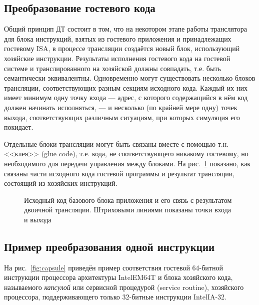 \subsection{Преобразование гостевого кода}

Общий принцип ДТ состоит в том, что на некотором этапе работы транслятора для блока инструкций, взятых из гостевого приложения и принадлежащих гостевому ISA, в процессе трансляции создаётся новый блок, использующий хозяйские инструкции. Результаты исполнения гостевого кода на гостевой системе и транслированного на хозяйской должны совпадать, т.е. быть семантически эквивалентны. Одновременно могут существовать несколько блоков трансляции, соответствующих разным секциям исходного кода. Каждый их них имеет минимум одну точку входа --- адрес, с которого содержащийся в нём код должен начинать исполняться, --- и несколько (по крайней мере одну) точек выхода, соответствующих различным ситуациям, при которых симуляция его покидает.

Отдельные блоки трансляции могут быть связаны вместе с помощью т.н. <<клея>> (\abbr glue code), т.е. кода, не соответствующего никакому гостевому, но необходимого для передачи управления между блоками. На рис.~\ref{fig:bb-translation} показано, как связаны части исходного кода гостевой программы и результат трансляции, состоящий из хозяйских инструкций. 

\begin{figure}[htb]
    \centering
    \caption[Исходный код и результат трансляции]{Исходный код базового блока приложения и его связь с результатом двоичной трансляции. Штриховыми линиями показаны точки входа и выхода}
    \label{fig:bb-translation}
\end{figure}


\subsection{Пример преобразования одной инструкции}

На рис.~\ref{fig:capsule} приведён пример соответствия гостевой 64-битной инструкции процессора архитектуры Intel\textregistered EM64T и блока хозяйского кода, называемого \textit{капсулой} или сервисной процедурой (\abbr service routine), хозяйского процессора, поддерживающего только 32-битные инструкции Intel\textregistered IA-32. 



